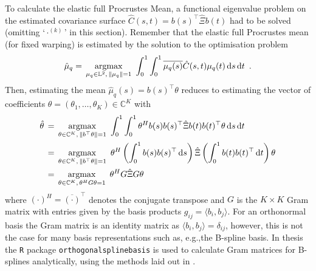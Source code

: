 To calculate the elastic full Procrustes Mean, a functional eigenvalue problem on the estimated covariance surface $\hat{C}(s,t) = b(s)^\top \hat\Xi b(t)$ had to be solved (omitting \enquote*{$\cdot^{(k)}$} in this section).
Remember that the elastic full Procrustes mean (for fixed warping) is estimated by the solution to the optimisation problem
\begin{equation}
\hat\mu_q = \, \operatorname*{argmax}_{\mu_q \in \mathbb{L}^2,\,\lVert\mu_q\rVert = 1}\,\,
   \int_0^1 \int_0^1 \overline{\mu_q (s)} \hat C(s,t) \mu_q(t) \mathop{\mathrm{d}s}\mathop{\mathrm{d}t}\,\,.
\end{equation}
Then, estimating the mean $\hat \mu_q (s) = b(s)^\top \theta$ reduces to estimating the vector of coefficients $\theta = (\theta_1, \dots, \theta_K) \in \mathbb{C}^K$ with
\begin{align}
  \hat\theta& \, = \, \operatorname*{argmax}_{\theta \in \mathbb{C}^K,\,\lVert b^\top\theta\rVert = 1}\,\,
    \int_0^1 \int_0^1 \theta^H b(s) b(s)^\top \hat\Xi b(t) b(t)^\top \theta \mathop{\mathrm{d}s}\mathop{\mathrm{d}t} \\
  &\, = \, \operatorname*{argmax}_{\theta \in \mathbb{C}^K,\,\lVert b^\top\theta\rVert = 1}\,\,
    \theta^H \left( \int_0^1 b(s) b(s)^\top \mathop{\mathrm{d}s} \right) \hat\Xi \left( \int_0^1 b(t) b(t)^\top \mathop{\mathrm{d}t}\right) \theta \\
  &\, = \, \operatorname*{argmax}_{\theta \in \mathbb{C}^K,\,\theta^H G \theta = 1}\,\,
    \theta^H G \hat\Xi G \theta \label{eq:3-target}
\end{align}
where $(\cdot)^H = \overline{(\cdot)}^\top$ denotes the conjugate transpose and $G$ is the $K \times K$ Gram matrix with entries given by the basis products $g_{ij} = \langle b_i, b_j \rangle$.
For an orthonormal basis the Gram matrix is an identity matrix as $\langle b_i, b_j \rangle = \delta_{ij}$, however, this is not the case for many basis representations such as, e.g.,the B-spline basis.
In thesis the \texttt{R} package \texttt{orthogonalsplinebasis} \parencite{orthogonalsplinebasis} is used to calculate Gram matrices for B-splines analytically, using the methods laid out in \cite{Redd2012}.

